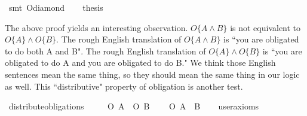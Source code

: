 \begin{isabellebody}
\ {\isacharparenleft}smt\ O{\isacharunderscore}diamond{\isacharparenright}\isanewline
%
\isanewline
\ \ \isamarkupfalse%
\ {\isacharquery}thesis\ \isamarkupfalse%
\isanewline
%
\isanewline
%
%
\endisatagproof
{\isafoldproof}%
%
\isadelimproof
%
\endisadelimproof
%
\begin{isamarkuptext}%
The above proof yields an interesting observation.  $O \{ A \wedge B \} $ is not equivalent to 
$O\{A\} \wedge O\{B\}$. The rough English translation of  $O \{ A \wedge B \} $ is ``you are obligated to 
do both A and B". The rough English translation of $O\{A\} \wedge O\{B\}$ is ``you are obligated to do A 
and you are obligated to do B." We think those English sentences mean the same thing, so they should mean 
the same thing in our logic as well. This ``distributive" property of obligation is another test.%
\end{isamarkuptext}\isamarkuptrue%
\isamarkupfalse%
\ distribute{\isacharunderscore}obligations{\isacharcolon}\isanewline
\ \ \ \ {\isachardoublequoteopen}{\isasymTurnstile}\ {\isacharparenleft}O\ {\isacharbraceleft}A{\isacharbraceright}\ \isactrlbold {\isasymand}\ O\ {\isacharbraceleft}B{\isacharbraceright}{\isacharparenright}{\isachardoublequoteclose}\isanewline
\ \ \ {\isachardoublequoteopen}{\isasymTurnstile}\ O\ {\isacharbraceleft}A\ \isactrlbold {\isasymand}\ B{\isacharbraceright}{\isachardoublequoteclose}\isanewline
\ \ \isamarkupfalse%
\ {\isacharbrackleft}user{\isacharunderscore}axioms{\isacharbrackright}%
\isadelimproof
\ %
\endisadelimproof
%
\isatagproof
{}\isamarkupfalse%
\isanewline
%
\end{isabellebody}
